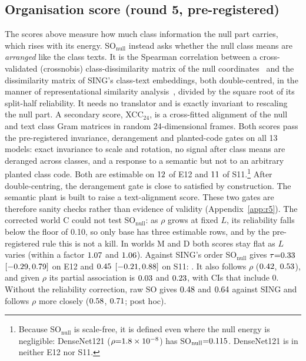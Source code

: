 \documentclass[10pt]{article}
\begin{document}
\subsection{Organisation score (round 5, pre-registered)}
\label{app:org}
The scores above measure how much class information the null part carries, which rises with its energy.
SO$_{\mathrm{null}}$ instead asks whether the null class means are \emph{arranged} like the class texts.
It is the Spearman correlation between a cross-validated (crossnobis) class-dissimilarity matrix of the null coordinates~\citep{walther2016reliability} and the dissimilarity matrix of SING's class-text embeddings, both double-centred, in the manner of representational similarity analysis~\citep{kriegeskorte2008rsa,nili2014toolbox}, divided by the square root of its split-half reliability. It needs no translator and is exactly invariant to rescaling the null part.
A secondary score, XCC$_{24}$, is a cross-fitted alignment of the null and text class Gram matrices in random 24-dimensional frames.
Both scores pass the pre-registered invariance, derangement and planted-code gates on all 13 models: exact invariance to scale and rotation, no signal after class means are deranged across classes, and a response to a semantic but not to an arbitrary planted class code. Both are estimable on $12$ of E12 and $11$ of S11.\footnote{Because SO$_{\mathrm{null}}$ is scale-free, it is defined even where the null energy is negligible: DenseNet121 ($\rho{=}1.8\times10^{-8}$) has SO$_{\mathrm{null}}{=}0.115$. DenseNet121 is in neither E12 nor S11.} After double-centring, the derangement gate is close to satisfied by construction. The semantic plant is built to raise a text-alignment score. These two gates are therefore sanity checks rather than evidence of validity (Appendix~\ref{app:r5}).
The corrected world C could not test SO$_{\mathrm{null}}$: as $\rho$ grows at fixed $L$, its reliability falls below the floor of 0.10, so only \FSOGFourTestable{} base has three estimable rows, and by the pre-registered rule this is not a kill. In worlds M and D both scores stay flat as $L$ varies (within a factor $1.07$ and $1.06$).
Against SING's order SO$_{\mathrm{null}}$ gives $\tau{=}0.33$ $[-0.29,0.79]$ on E12 and $0.45$ $[-0.21,0.88]$ on S11: \FSOLabel. It also follows $\rho$ ($0.42$, $0.53$), and given $\rho$ its partial association is $0.03$ and $0.23$, with CIs that include 0. Without the reliability correction, raw SO gives $0.48$ and $0.64$ against SING and follows $\rho$ more closely ($0.58$, $0.71$; post hoc).
\end{document}
